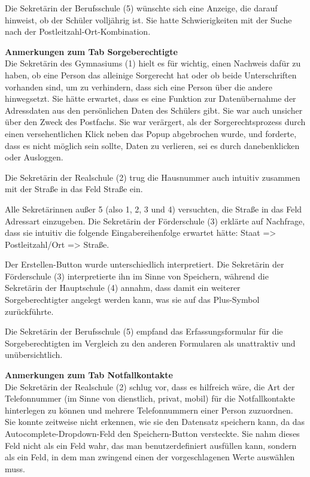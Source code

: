 Die Sekretärin der Berufsschule (5) wünschte sich eine Anzeige, die darauf hinweist, ob der Schüler volljährig ist. Sie hatte Schwierigkeiten mit der Suche nach der Postleitzahl-Ort-Kombination.

\textbf{Anmerkungen zum Tab \glqq Sorgeberechtigte\grqq{}}\\
Die Sekretärin des Gymnasiums (1) hielt es für wichtig, einen Nachweis dafür zu haben, ob eine Person das alleinige Sorgerecht hat oder ob beide Unterschriften vorhanden sind, um zu verhindern, dass sich eine Person über die andere hinwegsetzt. Sie hätte erwartet, dass es eine Funktion zur Datenübernahme der Adressdaten aus den persönlichen Daten des Schülers gibt. Sie war auch unsicher über den Zweck des Postfachs. Sie war verärgert, als der Sorgerechtsprozess durch einen versehentlichen Klick neben das Popup abgebrochen wurde, und forderte, dass es nicht möglich sein sollte, Daten zu verlieren, sei es durch danebenklicken oder Ausloggen.

Die Sekretärin der Realschule (2) trug die Hausnummer auch intuitiv zusammen mit der Straße in das Feld \glqq Straße\grqq{} ein.

Alle Sekretärinnen außer 5 (also 1, 2, 3 und 4) versuchten, die Straße in das Feld \glqq Adressart\grqq{} einzugeben. Die Sekretärin der Förderschule (3) erklärte auf Nachfrage, dass sie intuitiv die folgende Eingabereihenfolge erwartet hätte: Staat => Postleitzahl/Ort => Straße.

Der \glqq Erstellen\grqq{}-Button wurde unterschiedlich interpretiert. Die Sekretärin der Förderschule (3) interpretierte ihn im Sinne von \glqq Speichern\grqq{}, während die Sekretärin der Hauptschule (4) annahm, dass damit ein weiterer Sorgeberechtigter angelegt werden kann, was sie auf das Plus-Symbol zurückführte.

Die Sekretärin der Berufsschule (5) empfand das Erfassungsformular für die Sorgeberechtigten im Vergleich zu den anderen Formularen als unattraktiv und unübersichtlich.

\textbf{Anmerkungen zum Tab \glqq Notfallkontakte\grqq{}}\\
Die Sekretärin der Realschule (2) schlug vor, dass es hilfreich wäre, die Art der Telefonnummer (im Sinne von dienstlich, privat, mobil) für die Notfallkontakte hinterlegen zu können und mehrere Telefonnummern einer Person zuzuordnen. Sie konnte zeitweise nicht erkennen, wie sie den Datensatz speichern kann, da das Autocomplete-Dropdown-Feld den Speichern-Button versteckte. Sie nahm dieses Feld nicht als ein Feld wahr, das man benutzerdefiniert ausfüllen kann, sondern als ein Feld, in dem man zwingend einen der vorgeschlagenen Werte auswählen muss.

